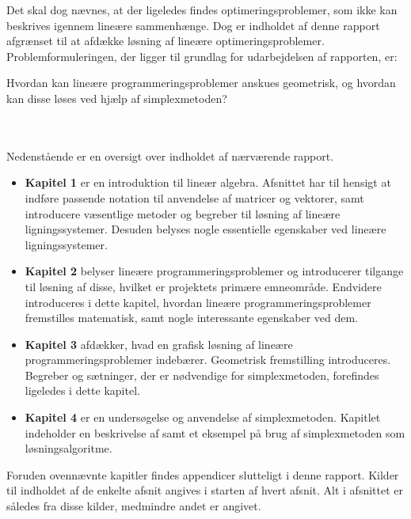 Det skal dog nævnes, at der ligeledes findes optimeringsproblemer, som ikke kan beskrives igennem lineære sammenhænge. 
Dog er indholdet af denne rapport afgrænset til at afdække løsning af lineære optimeringsproblemer.
Problemformuleringen, der ligger til grundlag for udarbejdelsen af rapporten, er: 
%
\begin{col}{}{}
Hvordan kan lineære programmeringsproblemer anskues geometrisk, og hvordan kan disse løses ved hjælp af simplexmetoden?
\end{col}
% 
\noindent
%
\\\\
Nedenstående er en oversigt over indholdet af nærværende rapport.
%
\begin{itemize}[itemindent=0em]
\item[]\textbf{Kapitel 1} er en introduktion til lineær algebra.
Afsnittet har til hensigt at indføre passende notation til anvendelse af matricer og vektorer, samt introducere væsentlige metoder og begreber til løsning af lineære ligningssystemer. 
Desuden belyses nogle essentielle egenskaber ved lineære ligningssystemer. 
\item[]\textbf{Kapitel 2} belyser lineære programmeringsproblemer og introducerer tilgange til løsning af disse, hvilket er projektets primære emneområde. 
Endvidere introduceres i dette kapitel, hvordan lineære programmeringsproblemer fremstilles matematisk, samt nogle interessante egenskaber ved dem. 
\item[]\textbf{Kapitel 3} afdækker, hvad en grafisk løsning af lineære programmeringsproblemer indebærer. 
Geometrisk fremstilling introduceres. 
Begreber og sætninger, der er nødvendige for simplexmetoden, forefindes ligeledes i dette kapitel. 
\item[]\textbf{Kapitel 4} er en undersøgelse og anvendelse af simplexmetoden. 
Kapitlet indeholder en beskrivelse af samt et eksempel på brug af simplexmetoden som løsningsalgoritme.
\end{itemize}
%
Foruden ovennævnte kapitler findes appendicer slutteligt i denne rapport.
Kilder til indholdet af de enkelte afsnit angives i starten af hvert afsnit. 
Alt i afsnittet er således fra disse kilder, medmindre andet er angivet. 